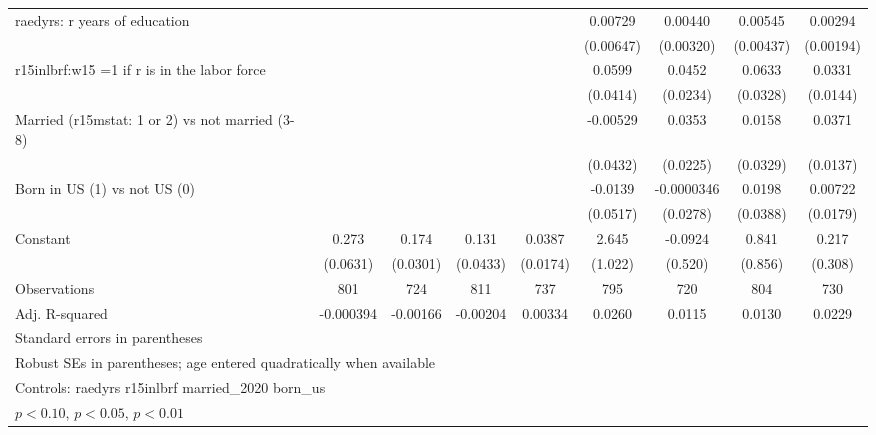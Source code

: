 \begin{table}[htbp]
\begin{tabular}{l*{8}{c}}
\addlinespace
raedyrs: r years of education&                  &                  &                  &                  &  0.00729         &  0.00440         &  0.00545         &  0.00294         \\
                &                  &                  &                  &                  &(0.00647)         &(0.00320)         &(0.00437)         &(0.00194)         \\
\addlinespace
r15inlbrf:w15 =1 if r is in the labor force&                  &                  &                  &                  &   0.0599         &   0.0452\sym{*}  &   0.0633\sym{*}  &   0.0331\sym{**} \\
                &                  &                  &                  &                  & (0.0414)         & (0.0234)         & (0.0328)         & (0.0144)         \\
\addlinespace
Married (r15mstat: 1 or 2) vs not married (3-8)&                  &                  &                  &                  & -0.00529         &   0.0353         &   0.0158         &   0.0371\sym{***}\\
                &                  &                  &                  &                  & (0.0432)         & (0.0225)         & (0.0329)         & (0.0137)         \\
\addlinespace
Born in US (1) vs not US (0)&                  &                  &                  &                  &  -0.0139         &-0.0000346         &   0.0198         &  0.00722         \\
                &                  &                  &                  &                  & (0.0517)         & (0.0278)         & (0.0388)         & (0.0179)         \\
\addlinespace
Constant        &    0.273\sym{***}&    0.174\sym{***}&    0.131\sym{***}&   0.0387\sym{**} &    2.645\sym{***}&  -0.0924         &    0.841         &    0.217         \\
                & (0.0631)         & (0.0301)         & (0.0433)         & (0.0174)         &  (1.022)         &  (0.520)         &  (0.856)         &  (0.308)         \\
\midrule
Observations    &      801         &      724         &      811         &      737         &      795         &      720         &      804         &      730         \\
Adj. R-squared  &-0.000394         & -0.00166         & -0.00204         &  0.00334         &   0.0260         &   0.0115         &   0.0130         &   0.0229         \\
\bottomrule
\multicolumn{9}{l}{\footnotesize Standard errors in parentheses}\\
\multicolumn{9}{l}{\footnotesize Robust SEs in parentheses; age entered quadratically when available}\\
\multicolumn{9}{l}{\footnotesize Controls:  raedyrs r15inlbrf married\_2020 born\_us}\\
\multicolumn{9}{l}{\footnotesize \sym{*} \(p<0.10\), \sym{**} \(p<0.05\), \sym{***} \(p<0.01\)}\\
\end{tabular}
\end{table}

